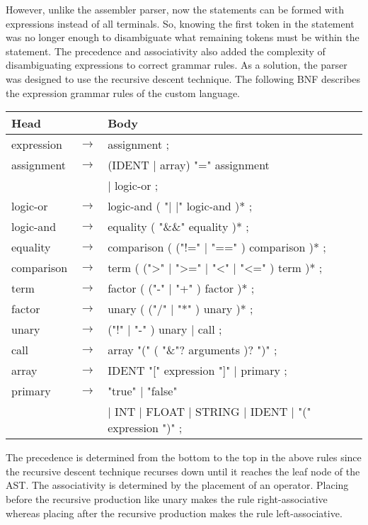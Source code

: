 \documentclass[manuscript,screen,nonacm]{acmart}
\begin{document}
However, unlike the assembler parser, now the statements can be formed with expressions instead of all terminals. So, knowing the first token in the statement was no longer enough to disambiguate what remaining tokens must be within the statement. The precedence and associativity also added the complexity of disambiguating expressions to correct grammar rules. 
As a solution, the parser was designed to use the recursive descent technique. The following BNF describes the expression grammar rules of the custom language. 

\begin{center}
\begin{tabular}{l l l}
    \hline
    Head & & Body \\
    \hline
    expression & $\rightarrow$ & assignment ; \\
    assignment & $\rightarrow$ & (IDENT | array) "=" assignment \\
    ~ & ~ & | logic-or ; \\
    logic-or & $\rightarrow$ & logic-and ( "| |" logic-and )* ; \\
    logic-and & $\rightarrow$ & equality ( "\&\&" equality )* ; \\
    equality & $\rightarrow$ & comparison ( ("!=" | "==" ) comparison )* ; \\
    comparison & $\rightarrow$ & term ( (">" | ">=" | "<" | "<=" ) term )* ; \\
    term & $\rightarrow$ & factor ( ("-" | "+" ) factor )* ; \\
    factor & $\rightarrow$ & unary ( ("/" | "*" ) unary )* ; \\
    unary & $\rightarrow$ & ("!" | "-" ) unary | call ; \\
    call & $\rightarrow$ & array "(" ( "\&"? arguments )? ")" ; \\
    array & $\rightarrow$ & IDENT "[" expression "]" | primary ; \\
    primary & $\rightarrow$ & "true" | "false" \\
    ~ & ~ & | INT | FLOAT | STRING | IDENT | "(" expression ")" ; \\
    \hline
\end{tabular}
\end{center}

The precedence is determined from the bottom to the top in the above rules since the recursive descent technique recurses down until it reaches the leaf node of the AST. The associativity is determined by the placement of an operator. Placing before the recursive production like unary makes the rule right-associative whereas placing after the recursive production makes the rule left-associative.
\end{document}
